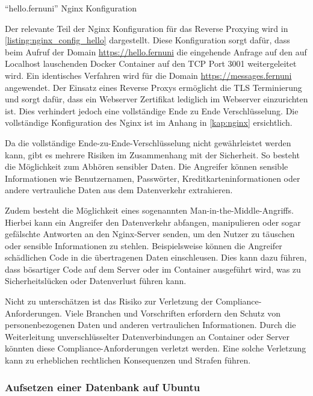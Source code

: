 \begin{listing}[ht]
    \caption{\enquote{hello.fernuni} Nginx Konfiguration}
    \label{listing:nginx_config_hello}
\end{listing}

Der relevante Teil der Nginx Konfiguration für das Reverse Proxying wird in \autoref{listing:nginx_config_hello} dargestellt. Diese Konfiguration sorgt dafür, dass beim Aufruf der Domain \url{https://hello.fernuni} die eingehende Anfrage auf den auf Localhost lauschenden Docker Container auf den \ac{TCP} Port 3001 weitergeleitet wird. Ein identisches Verfahren wird für die Domain \url{https://messages.fernuni} angewendet. Der Einsatz eines Reverse Proxys ermöglicht die TLS Terminierung und sorgt dafür, dass ein Webserver Zertifikat lediglich im Webserver einzurichten ist. Dies verhindert jedoch eine vollständige Ende zu Ende Verschlüsselung. Die vollständige Konfiguration des Nginx ist im Anhang in \autoref{kap:nginx} ersichtlich.

Da die vollständige Ende-zu-Ende-Verschlüsselung nicht gewährleistet werden kann, gibt es mehrere Risiken im Zusammenhang mit der Sicherheit. So besteht die Möglichkeit zum Abhören sensibler Daten. Die Angreifer können sensible Informationen wie Benutzernamen, Passwörter, Kreditkarteninformationen oder andere vertrauliche Daten aus dem Datenverkehr extrahieren.

Zudem besteht die Möglichkeit eines sogenannten Man-in-the-Middle-Angriffs. Hierbei kann ein Angreifer den Datenverkehr abfangen, manipulieren oder sogar gefälschte Antworten an den Nginx-Server senden, um den Nutzer zu täuschen oder sensible Informationen zu stehlen. Beispielsweise können die Angreifer schädlichen Code in die übertragenen Daten einschleusen. Dies kann dazu führen, dass bösartiger Code auf dem Server oder im Container ausgeführt wird, was zu Sicherheitslücken oder Datenverlust führen kann.

Nicht zu unterschätzen ist das Risiko zur Verletzung der Compliance-Anforderungen. Viele Branchen und Vorschriften erfordern den Schutz von personenbezogenen Daten und anderen vertraulichen Informationen. Durch die Weiterleitung unverschlüsselter Datenverbindungen an Container oder Server könnten diese Compliance-Anforderungen verletzt werden. Eine solche Verletzung kann zu erheblichen rechtlichen Konsequenzen und Strafen führen. 

\subsubsection{Aufsetzen einer Datenbank auf Ubuntu}


